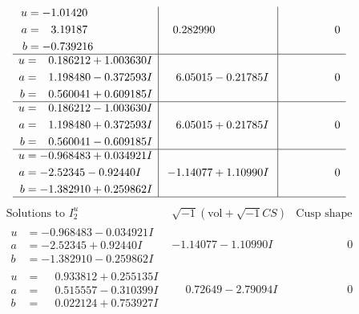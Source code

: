 \documentclass[1p]{elsarticle_modified}
\theoremstyle{definition}
\newcommand{\I}{\sqrt{-1}}
\begin{document}
$$\begin{array}{c|c|c}
\begin{aligned}
u &= -1.01420\phantom{ +0.000000I} \\
a &= \phantom{-}3.19187\phantom{ +0.000000I} \\
b &= -0.739216\phantom{ +0.000000I}\end{aligned}
 & \phantom{-}0.282990\phantom{ +0.000000I} & \phantom{-0.000000 } 0 \\ \hline\begin{aligned}
u &= \phantom{-}0.186212 + 1.003630 I \\
a &= \phantom{-}1.198480 - 0.372593 I \\
b &= \phantom{-}0.560041 + 0.609185 I\end{aligned}
 & \phantom{-}6.05015 - 0.21785 I & \phantom{-0.000000 } 0 \\ \hline\begin{aligned}
u &= \phantom{-}0.186212 - 1.003630 I \\
a &= \phantom{-}1.198480 + 0.372593 I \\
b &= \phantom{-}0.560041 - 0.609185 I\end{aligned}
 & \phantom{-}6.05015 + 0.21785 I & \phantom{-0.000000 } 0 \\ \hline\begin{aligned}
u &= -0.968483 + 0.034921 I \\
a &= -2.52345 - 0.92440 I \\
b &= -1.382910 + 0.259862 I\end{aligned}
 & -1.14077 + 1.10990 I & \phantom{-0.000000 } 0\\
 \hline 
 \end{array}$$\newpage$$\begin{array}{c|c|c}  
\text{Solutions to }I^u_{2}& \I (\text{vol} + \sqrt{-1}CS) & \text{Cusp shape}\\
 \hline 
\begin{aligned}
u &= -0.968483 - 0.034921 I \\
a &= -2.52345 + 0.92440 I \\
b &= -1.382910 - 0.259862 I\end{aligned}
 & -1.14077 - 1.10990 I & \phantom{-0.000000 } 0 \\ \hline\begin{aligned}
u &= \phantom{-}0.933812 + 0.255135 I \\
a &= \phantom{-}0.515557 - 0.310399 I \\
b &= \phantom{-}0.022124 + 0.753927 I\end{aligned}
 & \phantom{-}0.72649 - 2.79094 I & \phantom{-0.000000 } 0 \\ \hline\begin{aligned}

\end{aligned}
\end{array}$$
\end{document}
